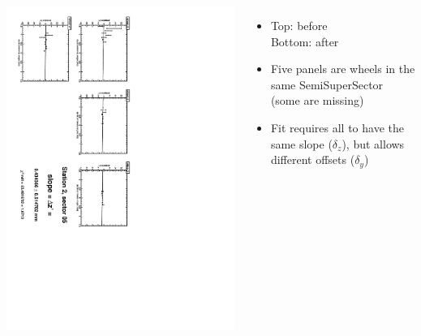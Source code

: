 \documentclass[compress]{beamer}
\begin{document}
\begin{frame}
\begin{columns}
\vfill
\includegraphics[height=\linewidth, angle=90]{zfits_after/zfit_2_05.pdf}
\begin{itemize}
\item Top: before \\ Bottom: after
\item Five panels are wheels in the same SemiSuperSector (some are missing)
\item Fit requires all to have the same slope ($\delta_z$), but allows different offsets ($\delta_y$)
\end{itemize}
\end{columns}
\end{frame}
\end{document}
